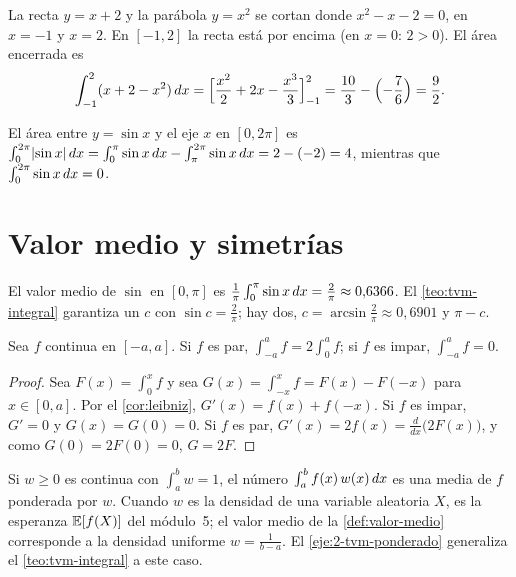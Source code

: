 \begin{ejemplo}\label{ej:area-parabola}
La recta $y=x+2$ y la parábola $y=x^{2}$ se cortan donde $x^{2}-x-2=0$, en $x=-1$ y $x=2$. En $[-1,2]$ la recta está por encima (en $x=0$: $2>0$). El área encerrada es
\[
\int_{-1}^{2}(x+2-x^{2})\mathop{}\!d x=\Bigl[\frac{x^{2}}{2}+2x-\frac{x^{3}}{3}\Bigr]_{-1}^{2}=\frac{10}{3}-\Bigl(-\frac76\Bigr)=\frac92 .
\]
\end{ejemplo}

\begin{ejemplo}\label{ej:area-seno}
El área entre $y=\sin x$ y el eje $x$ en $[0,2\pi]$ es $\int_0^{2\pi}\lvert\sin x\rvert\mathop{}\!d x=\int_0^{\pi}\sin x\mathop{}\!d x-\int_{\pi}^{2\pi}\sin x\mathop{}\!d x=2-(-2)=4$, mientras que $\int_0^{2\pi}\sin x\mathop{}\!d x=0$.
\end{ejemplo}

\section{Valor medio y simetrías}

\begin{ejemplo}\label{ej:media-seno}
El valor medio de $\sin$ en $[0,\pi]$ es $\frac1\pi\int_0^{\pi}\sin x\mathop{}\!d x=\frac2\pi\approx0{,}6366$. El \cref{teo:tvm-integral} garantiza un $c$ con $\sin c=\frac2\pi$; hay dos, $c=\arcsin\frac2\pi\approx0{,}6901$ y $\pi-c$.
\end{ejemplo}

\begin{proposicion}\label{prop:par-impar}
Sea $f$ continua en $[-a,a]$. Si $f$ es par, $\int_{-a}^{a}f=2\int_0^{a}f$; si $f$ es impar, $\int_{-a}^{a}f=0$.
\end{proposicion}

\begin{proof}
Sea $F(x)=\int_0^xf$ y sea $G(x)=\int_{-x}^{x}f=F(x)-F(-x)$ para $x\in[0,a]$. Por el \cref{cor:leibniz}, $G'(x)=f(x)+f(-x)$. Si $f$ es impar, $G'=0$ y $G(x)=G(0)=0$. Si $f$ es par, $G'(x)=2f(x)=\frac{d}{dx}\bigl(2F(x)\bigr)$, y como $G(0)=2F(0)=0$, $G=2F$.
\end{proof}

\begin{observacion}
Si $w\ge0$ es continua con $\int_a^b w=1$, el número $\int_a^b f(x)\,w(x)\mathop{}\!d x$ es una media de $f$ ponderada por $w$. Cuando $w$ es la densidad de una variable aleatoria $X$, es la esperanza $\mathbb{E}[f(X)]$ del módulo~5; el valor medio de la \cref{def:valor-medio} corresponde a la densidad uniforme $w=\frac{1}{b-a}$. El \cref{eje:2-tvm-ponderado} generaliza el \cref{teo:tvm-integral} a este caso.
\end{observacion}

